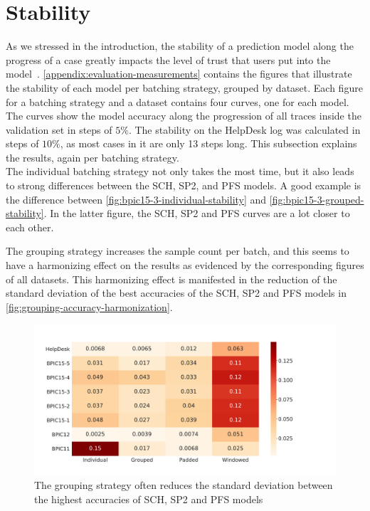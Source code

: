 \section{Stability}\label{sec:eval:stability}
As we stressed in the introduction, the stability of a prediction model along the progress of a case greatly impacts the level of trust that users put into the model~\cite{metzger2015}. \autoref{appendix:evaluation-measurements} contains the figures that illustrate the stability of each model per batching strategy, grouped by dataset. Each figure for a batching strategy and a dataset contains four curves, one for each model. The curves show the model accuracy along the progression of all traces inside the validation set in steps of $5\%$. The stability on the HelpDesk log was calculated in steps of $10\%$, as most cases in it are only 13 steps long. This subsection explains the results, again per batching strategy.\\

The individual batching strategy not only takes the most time, but it also leads to strong differences between the SCH, SP2, and PFS models. A good example is the difference between \autoref{fig:bpic15-3-individual-stability} and \autoref{fig:bpic15-3-grouped-stability}. In the latter figure, the SCH, SP2 and PFS curves are a lot closer to each other.

The grouping strategy increases the sample count per batch, and this seems to have a harmonizing effect on the results as evidenced by the corresponding figures of all datasets. This harmonizing effect is manifested in the reduction of the standard deviation of the best accuracies of the SCH, SP2 and PFS models in \autoref{fig:grouping-accuracy-harmonization}.

\begin{figure}
    \centering
    \includegraphics[width=\textwidth]{gfx/grouping-accuracy-harmonization.pdf}
    \caption[Batching strategy harmonizes top accuracies]{The grouping strategy often reduces the standard deviation between the highest accuracies of SCH, SP2 and PFS models}
    \label{fig:grouping-accuracy-harmonization}
\end{figure}

